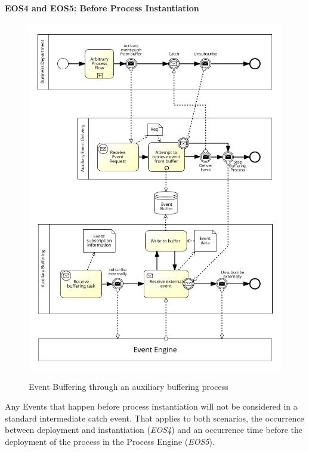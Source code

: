 \paragraph{EOS4 and EOS5: Before Process Instantiation}
\begin{figure}[]
	\myfloatalign
	{\hspace*{-0.0cm}\includegraphics[width=1.2\linewidth]{chapters/assessment/2A_buffer_pushing.png}}
	\caption{Event Buffering through an auxiliary buffering process}\label{fig:aux-buffering-process}
\end{figure}

Any Events that happen before process instantiation will not be considered in a standard intermediate catch event. That applies to both scenarios, the occurrence between deployment and instantiation (\textit{EOS4}) and an occurrence time before the deployment of the process in the Process Engine (\textit{EOS5}).

